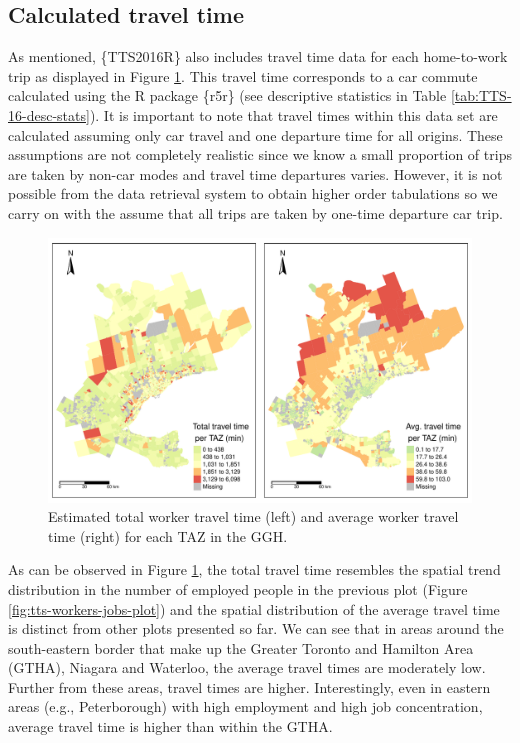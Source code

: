 \documentclass[Royal,times,sageh]{sagej}
\begin{document}
\newpage

\hypertarget{calculated-travel-time}{%
\subsection{Calculated travel time}\label{calculated-travel-time}}

As mentioned, \{TTS2016R\} also includes travel time data for each
home-to-work trip as displayed in Figure \ref{fig:plot-tt-ttpertrip}.
This travel time corresponds to a car commute calculated using the R
package \{r5r\} (see descriptive statistics in Table
\ref{tab:TTS-16-desc-stats}). It is important to note that travel times
within this data set are calculated assuming only car travel and one
departure time for all origins. These assumptions are not completely
realistic since we know a small proportion of trips are taken by non-car
modes and travel time departures varies. However, it is not possible
from the data retrieval system to obtain higher order tabulations so we
carry on with the assume that all trips are taken by one-time departure
car trip.

\begin{figure}
\includegraphics[width=1\linewidth]{Manuscript-Data-Package_files/figure-latex/plot-tt-ttpertrip-1} \caption{\label{fig:plot-tt-ttpertrip}Estimated total worker travel time (left) and average worker travel time (right) for each TAZ in the GGH.}\label{fig:plot-tt-ttpertrip}
\end{figure}

\newpage

As can be observed in Figure \ref{fig:plot-tt-ttpertrip}, the total
travel time resembles the spatial trend distribution in the number of
employed people in the previous plot (Figure
\ref{fig:tts-workers-jobs-plot}) and the spatial distribution of the
average travel time is distinct from other plots presented so far. We
can see that in areas around the south-eastern border that make up the
Greater Toronto and Hamilton Area (GTHA), Niagara and Waterloo, the
average travel times are moderately low. Further from these areas,
travel times are higher. Interestingly, even in eastern areas (e.g.,
Peterborough) with high employment and high job concentration, average
travel time is higher than within the GTHA.
\end{document}
